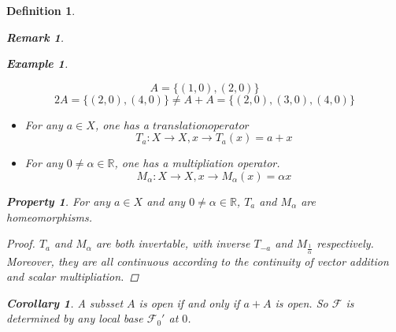 \documentclass{article}
\newtheorem*{property}{Property}
\newtheorem*{definition}{Definition}
\newtheorem*{remark}{Remark}
\newtheorem*{example}{Example}
\newtheorem*{corollary}{Corollary}
\begin{document}
\begin{definition}
\begin{remark}
\begin{example}
\begin{itemize}
                \[A = \{(1, 0), (2, 0)\} \]
                \[2A = \{(2, 0), (4, 0)\} \ne A + A = \{(2, 0), (3, 0), (4, 0)\}\]
            \end{itemize}
        \end{example}
        \begin{itemize}
            \item For any $a \in X$, one has a $translation operator$
            \[
                T_a: X \rightarrow X, x \rightarrow T_a(x) = a + x
            \]
            \item For any $0 \ne \alpha \in \mathbb{R}$, one has a multipliation operator.
            \[
                M_\alpha : X \rightarrow X, x \rightarrow M_\alpha(x) = \alpha x
            \]
        \end{itemize}
        \begin{property}
            For any $a \in X$ and any $0 \ne \alpha \in \mathbb{R}$, $T_a$ and $M_\alpha$ are homeomorphisms.
            \begin{proof}
                $T_a$ and $M_{\alpha}$ are both invertable, with inverse $T_{-a}$ and $M_{\frac{1}{\alpha}}$ respectively.
                Moreover, they are all continuous according to the continuity of vector addition and scalar multipliation.
            \end{proof}
        \end{property}
        \begin{corollary}
            A subsset $A$ is open if and only if $a + A$ is open. 
            So $\mathcal{F}$ is determined by any local base $\mathcal{F}_{0}'$ at $0$.
        \end{corollary}
    \end{remark}
\end{definition}
\end{document}
